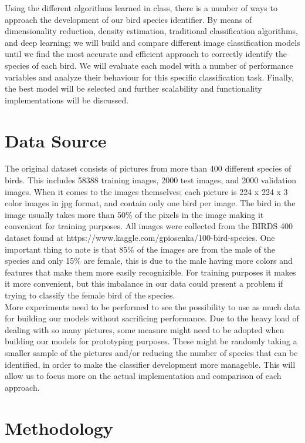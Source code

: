 \documentclass[11pt]{article}
\begin{document}
\begin{singlespace}
Using the different algorithms learned in class, there is a number of ways to approach the development of our bird species identifier. By means of dimensionality reduction, density estimation, traditional classification algorithms, and deep learning; we will build and compare different image classification models until we find the most accurate and efficient approach to correctly identify the species of each bird. We will evaluate each model with a number of performance variables and analyze their behaviour for this specific classification task. Finally, the best model will be selected and further scalability and functionality implementations will be discussed. 

\section{Data Source}

The original dataset consists of pictures from more than 400 different species of birds. This includes 58388 training images, 2000 test images, and 2000 validation images. When it comes to the images themselves; each picture is 224 x 224 x 3 color images in jpg format, and contain only one bird per image. The bird in the image usually takes more than 50\% of the pixels in the image making it convenient for training purposes. All images were collected from the BIRDS 400 dataset found at https://www.kaggle.com/gpiosenka/100-bird-species. One important thing to note is that 85\% of the images are from the male of the species and only 15\% are female, this is due to the male having more colors and features that make them more easily recognizible. For training purposes it makes it more convenient, but this imbalance in our data could present a problem if trying to classify the female bird of the species. \\

More experiments need to be performed to see the possibility to use as much data for building our models without sacrificing performance. Due to the heavy load of dealing with so many pictures, some measure might need to be adopted when building our models for prototyping purposes. These might be randomly taking a smaller sample of the pictures and/or reducing the number of species that can be identified, in order to make the classifier development more manageble. This will allow us to focus more on the actual implementation and comparison of each approach. 


\section{Methodology}


\end{singlespace}
\end{document}
